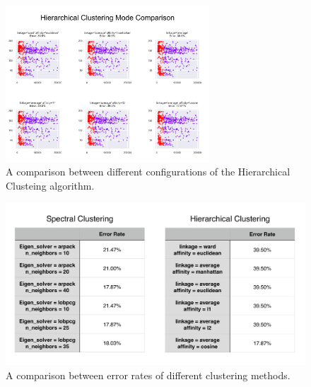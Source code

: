 \documentclass[10pt,twocolumn]{article}
\begin{document}
\begin{figure}[!b]
  \begin{center}
    \includegraphics[width=3in]{../plots/hierarchical_all.png}
  \end{center}
  \label{hierarchical_all}
  \caption{\small A comparison between different configurations of the Hierarchical Clusteing algorithm.}
\end{figure}

\begin{figure}[!b]
  \begin{center}
    \includegraphics[width=6in]{../plots/results.png}
  \end{center}
  \caption{\small A comparison between error rates of different clustering methods.}
  \label{results}
\end{figure}
\end{document}
